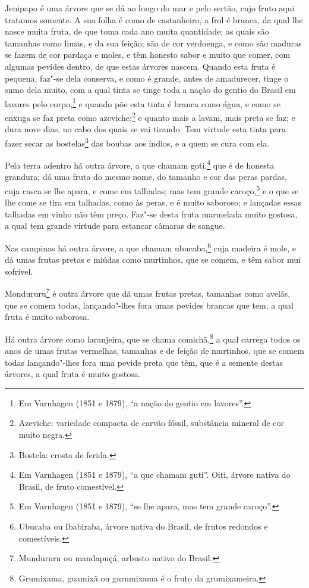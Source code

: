 \begin{linenumbers}
Jenipapo é uma árvore que se dá ao longo do mar e pelo sertão, cujo fruto aqui tratamos
somente. A sua folha é como de castanheiro, a frol é branca, da qual lhe nasce muita
fruta, de que toma cada ano muita quantidade; as quais são tamanhas como limas, e da sua
feição; são de cor verdoenga, e como são maduras se fazem de cor pardaça e moles, e têm
honesto sabor e muito que comer, com algumas pevides dentro, de que estas árvores nascem.
Quando esta fruta é pequena, faz"-se dela conserva, e como é grande, antes de amadurecer,
tinge o sumo dela muito, com a qual tinta se tinge toda a nação do gentio do Brasil em
lavores pelo corpo,\footnote{ Em Varnhagen (1851 e 1879), ``a nação do gentio em
lavores''.} e quando põe esta tinta é branca como água, e como se enxuga se faz preta como
azeviche;\footnote{ Azeviche: variedade compacta de carvão fóssil, substância mineral de
cor muito negra.} e quanto mais a lavam, mais preta se faz; e dura nove dias, no cabo dos
quais se vai tirando. Tem virtude esta tinta para fazer secar as bostelas\footnote{
Bostela: crosta de ferida.} das boubas aos índios, e a quem se cura com ela.


Pela terra adentro há outra árvore, a que chamam goti,\footnote{ Em Varnhagen (1851 e
1879), ``a que chamam guti''. Oiti, árvore nativa do Brasil, de fruto comestível.} que é
de honesta grandura; dá uma fruta do mesmo nome, do tamanho e cor das peras pardas, cuja
casca se lhe apara, e come em talhadas; mas tem grande caroço,\footnote{ Em Varnhagen
(1851 e 1879), ``se lhe apara, mas tem grande caroço''.} e o que se lhe come se tira em
talhadas, como às peras, e é muito saboroso; e lançadas essas talhadas em vinho não têm
preço. Faz"-se desta fruta marmelada muito gostosa, a qual tem grande virtude para estancar
câmaras de sangue.

Nas campinas há outra árvore, a que chamam ubucaba,\footnote{ Ubucaba ou Ibabiraba, árvore
nativa do Brasil, de frutos redondos e comestíveis.} cuja madeira é mole, e dá umas frutas
pretas e miúdas como murtinhos, que se comem, e têm sabor mui sofrível.

Mondururu\footnote{ Mundururu ou mandapuçá, arbusto nativo do Brasil.} é outra árvore que
dá umas frutas pretas, tamanhas como avelãs, que se comem todas, lançando"-lhes fora umas
pevides brancas que tem, a qual fruta é muito saborosa.

Há outra árvore como laranjeira, que se chama comichã,\footnote{ Grumixama, guamixã ou
gurumixama é o fruto da grumixameira.} a qual carrega todos os anos de umas frutas
vermelhas, tamanhas e de feição de murtinhos, que se comem todas lançando"-lhes fora uma
pevide preta que têm, que é a semente destas árvores, a qual fruta é muito gostosa.


\end{linenumbers}
